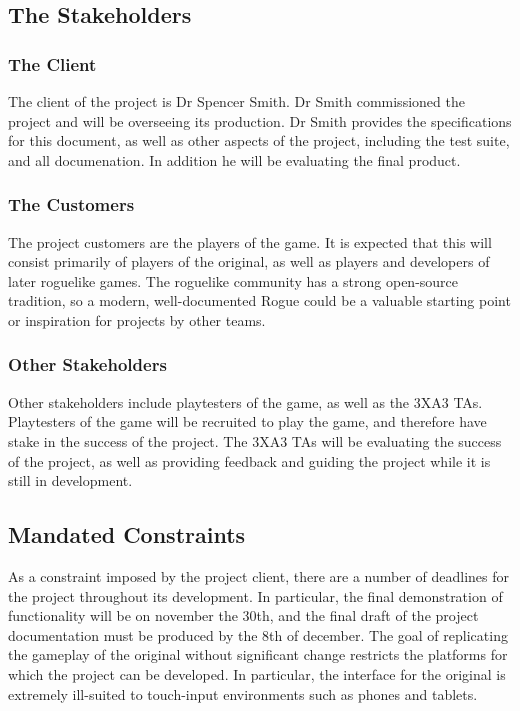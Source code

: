 \documentclass[12pt, titlepage]{article}
\begin{document}
\subsection{The Stakeholders}

\subsubsection{The Client}

The client of the project is Dr Spencer Smith. Dr Smith commissioned the project and will be overseeing its production. Dr Smith provides the specifications for this document, as well as other aspects of the project, including the test suite, and all documenation. In addition he will be evaluating the final product.

\subsubsection{The Customers}

The project customers are the players of the game. It is expected that this will consist primarily of players of the original, as well as players and developers of later roguelike games. The roguelike community has a strong open-source tradition, so a modern, well-documented Rogue could be a valuable starting point or inspiration for projects by other teams.

\subsubsection{Other Stakeholders}

Other stakeholders include playtesters of the game, as well as the 3XA3 TAs. Playtesters of the game will be recruited to play the game, and therefore have stake in the success of the project. The 3XA3 TAs will be evaluating the success of the project, as well as providing feedback and guiding the project while it is still in development.

\subsection{Mandated Constraints}

As a constraint imposed by the project client, there are a number of deadlines for the project throughout its development. In particular, the final demonstration of functionality will be on november the 30th, and the final draft of the project documentation must be produced by the 8th of december. The goal of replicating the gameplay of the original without significant change restricts the platforms for which the project can be developed. In particular, the interface for the original is extremely ill-suited to touch-input environments such as phones and tablets. 
\end{document}
